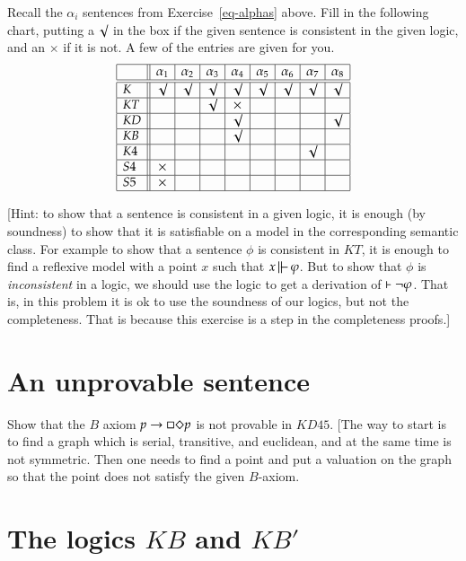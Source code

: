 \documentclass[12pt]{article}
\newcommand{\KD}{{KD}}
\newcommand{\KB}{{KB}}
\newcommand{\Kfour}{{K4}}
\begin{document}
  Recall the $\alpha_i$ sentences from Exercise~\ref{eq-alphas} above.
 Fill in the following chart, putting a $\surd$
in the box if the given sentence is consistent in the given
logic, and an $\times$ if it is not.
 A few of the entries are given for
you.
$$\begin{array}{|l||c|c|c|c|c|c|c|c|}
\hline
 & \alpha_1 & \alpha_2 & \alpha_3 & \alpha_4 
& \alpha_5 & \alpha_6 & \alpha_7 & \alpha_8  \\
\hline\hline
\K & \surd &\surd & \surd & \surd&\surd &\surd &\surd & \surd \\ \hline 
\K{T} & & &\surd & \times & & & &  \\ \hline 
\K{D} & & & & \surd & & & &\surd \\ \hline 
\KB & & & & \surd & & & &  \\  \hline 
\Kfour & & & & & & & \surd &  \\  \hline 
\Sfour & \times & & & & & & &  \\  \hline 
\Sfive & \times & & & & & & &  \\  \hline 
\end{array}
$$

[Hint: to show that a sentence is consistent in a given logic, it
is enough (by soundness) to show that it is satisfiable on a model in the 
corresponding semantic class.   For example to show that a sentence $\phi$
is consistent in $KT$, it is enough to find a reflexive model with a point $x$
such that $x\,\mbox{$\mathrel\|\mathrel{\mkern-9mu}-\,$} \varphi$.
But to show that $\phi$ is \emph{inconsistent} in a logic, we should use the logic 
to get a derivation of $\vdash\neg \varphi$.  That is, in this problem it is ok to use
the soundness of our logics, but not the completeness.  That is because this exercise
is a step in the completeness proofs.]


\section{An unprovable sentence}


 Show that the $B$ axiom $p\rightarrow \Box\Diamond p$ is not 
provable in $\KD{45}$.  
[The way to start is to find a graph which is serial, transitive, and
euclidean, and at the same time is not symmetric.
Then one needs to find a point and put a valuation on the graph
so that the point  does not satisfy the given $B$-axiom.


\section{The logics $KB$ and $KB'$}
\end{document}
